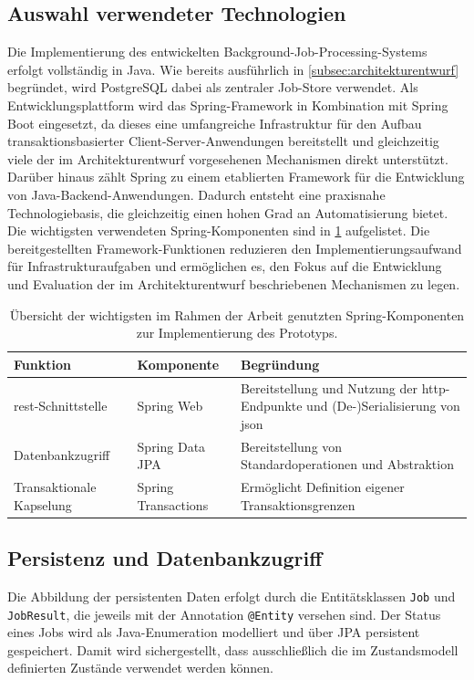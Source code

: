\subsection{Auswahl verwendeter Technologien}
\label{subsec:technologien}
Die Implementierung des entwickelten Background-Job-Processing-Systems erfolgt vollständig in Java.
Wie bereits ausführlich in \cref{subsec:architekturentwurf} begründet, wird PostgreSQL dabei als zentraler Job-Store verwendet.
Als Entwicklungsplattform wird das Spring-Framework in Kombination mit Spring Boot eingesetzt, da dieses eine umfangreiche
Infrastruktur für den Aufbau transaktionsbasierter Client-Server-Anwendungen bereitstellt und gleichzeitig viele der im
Architekturentwurf vorgesehenen Mechanismen direkt unterstützt.
Darüber hinaus zählt Spring zu einem etablierten Framework für die Entwicklung von Java-Backend-Anwendungen.
Dadurch entsteht eine praxisnahe Technologiebasis, die gleichzeitig einen hohen Grad an Automatisierung bietet.
Die wichtigsten verwendeten Spring-Komponenten sind in \cref{tab:technologieStack} aufgelistet.
Die bereitgestellten Framework-Funktionen reduzieren den Implementierungsaufwand für Infrastrukturaufgaben und ermöglichen
es, den Fokus auf die Entwicklung und Evaluation der im Architekturentwurf beschriebenen Mechanismen zu legen.
\begin{table}[h]
    \centering
    \begin{tabularx}{\textwidth}{llX}
        \toprule
        \textbf{Funktion} & \textbf{Komponente} & \textbf{Begründung}\\
        \midrule
        \gls{rest}-Schnittstelle & Spring Web & Bereitstellung und Nutzung der \gls{http}-Endpunkte und (De-)\allowbreak{}Serialisierung von \gls{json}\\
        Datenbankzugriff & Spring Data JPA & Bereitstellung von Standardoperationen und Abstraktion\\
        Transaktionale Kapselung & Spring Transactions & Ermöglicht Definition eigener Transaktionsgrenzen\\
        \bottomrule
    \end{tabularx}
    \caption[Übersicht der Spring-Komponenten]{Übersicht der wichtigsten im Rahmen der Arbeit genutzten Spring-Komponenten zur Implementierung
    des Prototyps.}
    \label{tab:technologieStack}
\end{table}

\subsection{Persistenz und Datenbankzugriff}
\label{subsec:impl_persistenz}
Die Abbildung der persistenten Daten erfolgt durch die Entitätsklassen \texttt{Job} und \texttt{JobResult}, die jeweils mit
der Annotation \texttt{@Entity} versehen sind.
Der Status eines Jobs wird als Java-Enumeration modelliert und über JPA persistent gespeichert.
Damit wird sichergestellt, dass ausschließlich die im Zustandsmodell definierten Zustände verwendet werden können.

